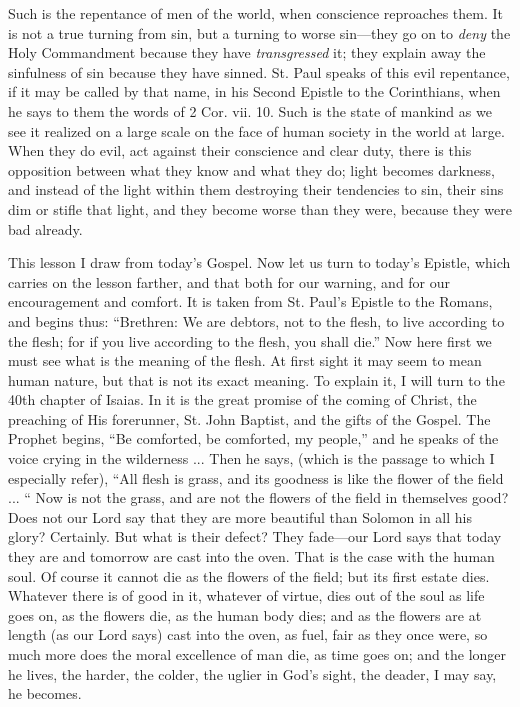 Such is the repentance of men of the world, when
conscience reproaches them. It is not a true turning from sin, but a
turning to worse sin—they go on to \emph{deny} the Holy Commandment
because they have \emph{transgressed} it; they explain away the
sinfulness of sin because they have sinned. St. Paul speaks of this
evil repentance, if it may be called by that name, in his Second
Epistle to the Corinthians, when he says to them the words of 2 Cor.
vii. 10. Such is the state of mankind as we see it realized on a large
scale on the face of human society in the world at large. When they do
evil, act against their conscience and clear duty, there is this
opposition between what they know and what they do; light becomes
darkness, and instead of the light within them destroying their
tendencies to sin, their sins dim or stifle that light, and they
become worse than they were, because they were bad already.

This lesson I draw from today's Gospel. Now let
us turn to today's Epistle, which carries on the lesson farther, and
that both for our warning, and for our encouragement and comfort. It
is taken from St. Paul's Epistle to the Romans, and begins thus: ``Brethren:
We are debtors, not to the flesh, to live according to the
flesh; for if you live according to the flesh, you shall die.'' Now
here first we must see what is the meaning of the flesh. At first
sight it may seem to mean human nature, but that is not its exact
meaning. To explain it, I will turn to the 40th chapter of Isaias. In
it is the great promise of the coming of Christ, the preaching of His
forerunner, St. John Baptist, and the gifts of the Gospel. The Prophet
begins, ``Be comforted, be comforted, my people,'' and he speaks of the
voice crying in the wilderness ... Then he says, (which is the passage
to which I especially refer), ``All flesh is grass, and its goodness is
like the flower of the field ... `` Now is not the grass, and are not
the flowers of the field in themselves good? Does not our Lord say
that they are more beautiful than Solomon in all his glory? Certainly.
But what is their defect? They fade—our Lord says that today they
are and tomorrow are cast into the oven. That is the case with the
human soul. Of course it cannot die as the flowers of the field; but
its first estate dies. Whatever there is of good in it, whatever of
virtue, dies out of the soul as life goes on, as the flowers die, as
the human body dies; and as the flowers are at length (as our Lord
says) cast into the oven, as fuel, fair as they once were, so much
more does the moral excellence of man die, as time goes on; and the
longer he lives, the harder, the colder, the uglier in God's
sight, the deader, I may say, he becomes.

